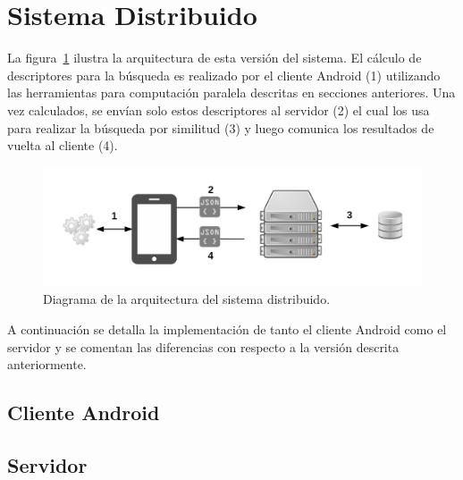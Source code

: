 \section{Sistema Distribuido}

La figura~\ref{arquitectura_distribuida} ilustra la arquitectura de esta versión del sistema. El cálculo de descriptores para la búsqueda es realizado por el cliente Android (1) utilizando las herramientas para computación paralela descritas en secciones anteriores. Una vez calculados, se envían solo estos descriptores al servidor (2) el cual los usa para realizar la búsqueda por similitud (3) y luego comunica los resultados de vuelta al cliente (4).

	\begin{figure}[!h]
		\centering
		\includegraphics[scale=1]{imagenes/cap3/arquitectura_distribuida.png}
		\caption{Diagrama de la arquitectura del sistema distribuido.}
		\label{arquitectura_distribuida}
	\end{figure}

A continuación se detalla la implementación de tanto el cliente Android como el servidor y se comentan las diferencias con respecto a la versión descrita anteriormente.

\subsection{Cliente Android}
\subsection{Servidor}
